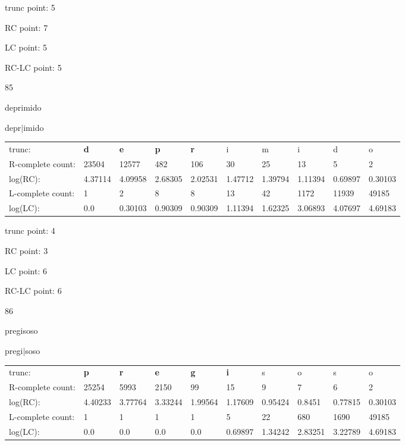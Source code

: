 \documentclass{article}
\begin{document}
trunc point: 5

RC point: 7

LC point: 5

RC-LC point: 5

\vspace{3em}



85

deprimido

depr$|$imido

\vspace{1em}

\begin{tabular}{l|lllllllll}

trunc: & {\color{red}\bf d} & {\color{red}\bf e} & {\color{red}\bf p} & {\color{red}\bf r} & i & m & i & d & o \\ 
R-complete count: & 23504 & 12577 & 482 & 106 & 30 & 25 & 13 & 5 & 2 \\ 
log(RC): & 4.37114 & 4.09958 & 2.68305 & 2.02531 & 1.47712 & 1.39794 & 1.11394 & 0.69897 & 0.30103 \\ 
L-complete count: & 1 & 2 & 8 & 8 & 13 & 42 & 1172 & 11939 & 49185 \\ 
log(LC): & 0.0 & 0.30103 & 0.90309 & 0.90309 & 1.11394 & 1.62325 & 3.06893 & 4.07697 & 4.69183 \\ 
\end{tabular}

trunc point: 4

RC point: 3

LC point: 6

RC-LC point: 6

\vspace{3em}



86

pregisoso

pregi$|$soso

\vspace{1em}

\begin{tabular}{l|lllllllll}

trunc: & {\color{red}\bf p} & {\color{red}\bf r} & {\color{red}\bf e} & {\color{red}\bf g} & {\color{red}\bf i} & s & o & s & o \\ 
R-complete count: & 25254 & 5993 & 2150 & 99 & 15 & 9 & 7 & 6 & 2 \\ 
log(RC): & 4.40233 & 3.77764 & 3.33244 & 1.99564 & 1.17609 & 0.95424 & 0.8451 & 0.77815 & 0.30103 \\ 
L-complete count: & 1 & 1 & 1 & 1 & 5 & 22 & 680 & 1690 & 49185 \\ 
log(LC): & 0.0 & 0.0 & 0.0 & 0.0 & 0.69897 & 1.34242 & 2.83251 & 3.22789 & 4.69183 \\ 
\end{tabular}
\end{document}

